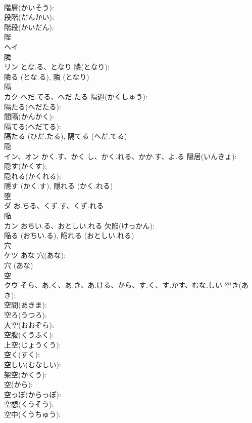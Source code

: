 \documentclass[8pt]{extreport}
\begin{document}
\begin{CJK}{UTF8}{min}
\\	階層(かいそう): 
\\	段階(だんかい): 
\\	階段(かいだん): 
\\	陛			
\\	ヘイ			
\\	隣			
\\	リン	とな.る、となり	隣(となり): 
\\	隣る (とな.る), 隣 (となり)
\\	隔			
\\	カク	へだ.てる、へだ.たる	隔週(かくしゅう): 
\\	隔たる(へだたる): 
\\	間隔(かんかく): 
\\	隔てる(へだてる): 
\\	隔たる (ひだ.たる), 隔てる (へだ.てる)
\\	隠			
\\	イン、オン	かく.す、かく.し、かく.れる、かか.す、よ.る	隠居(いんきょ): 
\\	隠す(かくす): 
\\	隠れる(かくれる): 
\\	隠す (かく.す), 隠れる (かく.れる)
\\	堕			
\\	ダ	お.ちる、くず.す、くず.れる		
\\	陥			
\\	カン	おちい.る、おとしい.れる	欠陥(けっかん): 
\\	陥る (おちい.る), 陥れる (おとしい.れる)
\\	穴			
\\	ケツ	あな	穴(あな): 
\\	穴 (あな)
\\	空			
\\	クウ	そら、あ.く、あ.き、あ.ける、から、す.く、す.かす、むな.しい	空き(あき): 
\\	空間(あきま): 
\\	空ろ(うつろ): 
\\	大空(おおぞら): 
\\	空腹(くうふく): 
\\	上空(じょうくう): 
\\	空く(すく): 
\\	空しい(むなしい): 
\\	架空(かくう): 
\\	空(から): 
\\	空っぽ(からっぽ): 
\\	空想(くうそう): 
\\	空中(くうちゅう): 

\end{CJK}
\end{document}
